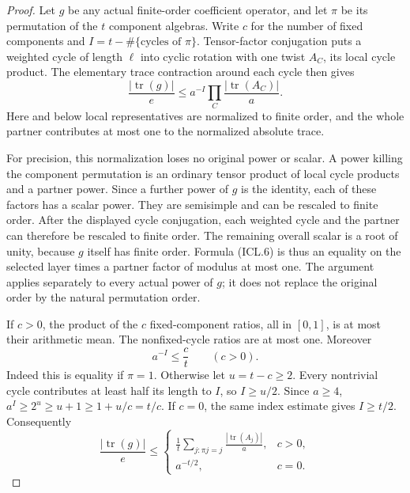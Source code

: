 \begin{proof}
Let $g$ be any actual finite-order coefficient operator, and let
$\pi$ be its permutation of the $t$ component algebras.  Write
$c$ for the number of fixed components and
$I=t-\#\{\text{cycles of }\pi\}$.
Tensor-factor conjugation puts a weighted cycle of length $\ell$
into cyclic rotation with one twist $A_C$, its local cycle
product.  The elementary trace contraction around each cycle
then gives
\[
 \frac{|\operatorname{tr}(g)|}{e}
       \le a^{-I}\prod_{C}\frac{|\operatorname{tr}(A_C)|}{a}.
 \tag{ICL.6}
\]
Here and below local representatives are normalized to finite
order, and the whole partner contributes at most one to the
normalized absolute trace.

For precision, this normalization loses no original power or
scalar.  A power killing the component permutation is an ordinary
tensor product of local cycle products and a partner power.
Since a further power of $g$ is the identity, each of these
factors has a scalar power.  They are semisimple and can be
rescaled to finite order.  After the displayed cycle conjugation,
each weighted cycle and the partner can therefore be rescaled
to finite order.  The remaining overall scalar is a root of
unity, because $g$ itself has finite order.  Formula (ICL.6) is
thus an equality on the selected layer times a partner factor
of modulus at most one.  The argument applies separately to
every actual power of $g$; it does not replace the original
order by the natural permutation order.

If $c>0$, the product of the $c$ fixed-component ratios, all in
$[0,1]$, is at most their arithmetic mean.  The nonfixed-cycle
ratios are at most one.  Moreover
\[
              a^{-I}\le\frac ct\qquad(c>0).
 \tag{ICL.7}
\]
Indeed this is equality if $\pi=1$.  Otherwise let $u=t-c\ge2$.
Every nontrivial cycle contributes at least half its length to
$I$, so $I\ge u/2$.  Since $a\ge4$,
$a^I\ge2^u\ge u+1\ge1+u/c=t/c$.
If $c=0$, the same index estimate gives $I\ge t/2$.
Consequently
\[
 \frac{|\operatorname{tr}(g)|}{e}
 \le\begin{cases}
 \displaystyle\frac1t\sum_{j:\pi j=j}
              \frac{|\operatorname{tr}(A_j)|}{a},&c>0,\\
 a^{-t/2},&c=0.
 \end{cases}
 \tag{ICL.8}
\]


\end{proof}
